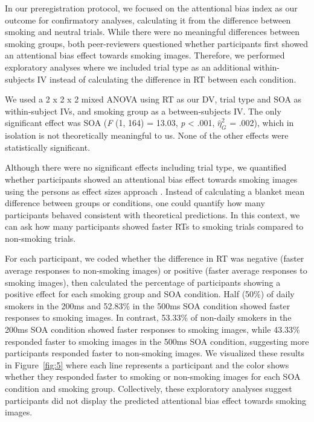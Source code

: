 \documentclass[empirical, authordate, issue]{jote-new-article}
\begin{document}
In our preregistration protocol, we focused on the attentional bias index as our outcome for confirmatory analyses, calculating it from the difference between smoking and neutral trials. While there were no meaningful differences between smoking groups, both peer-reviewers questioned whether participants first showed an attentional bias effect towards smoking images. Therefore, we performed exploratory analyses where we included trial type as an additional within-subjects IV instead of calculating the difference in RT between each condition.

We used a 2 x 2 x 2 mixed ANOVA using RT as our DV, trial type and SOA as within-subject IVs, and smoking group as a between-subjects IV. The only significant effect was SOA (\emph{F} (1, 164) = 13.03, \emph{p} < .001, $\hat{\eta}_{G}^{2}$ = .002), which in isolation is not theoretically meaningful to us. None of the other effects were statistically significant.

Although there were no significant effects including trial type, we quantified whether participants showed an attentional bias effect towards smoking images using the persons as effect sizes approach \parencite{Grice2020}. Instead of calculating a blanket mean difference between groups or conditions, one could quantify how many participants behaved consistent with theoretical predictions. In this context, we can ask how many participants showed faster RTs to smoking trials compared to non-smoking trials.

For each participant, we coded whether the difference in RT was negative (faster average responses to non-smoking images) or positive (faster average responses to smoking images), then calculated the percentage of participants showing a positive effect for each smoking group and SOA condition. Half (50\%) of daily smokers in the 200ms and 52.83\% in the 500ms SOA condition showed faster responses to smoking images. In contrast, 53.33\% of non-daily smokers in the 200ms SOA condition showed faster responses to smoking images, while 43.33\% responded faster to smoking images in the 500ms SOA condition, suggesting more participants responded faster to non-smoking images. We visualized these results in Figure~\ref{fig:5} where each line represents a participant and the color shows whether they responded faster to smoking or non-smoking images for each SOA condition and smoking group. Collectively, these exploratory analyses suggest participants did not display the predicted attentional bias effect towards smoking images.
\end{document}
